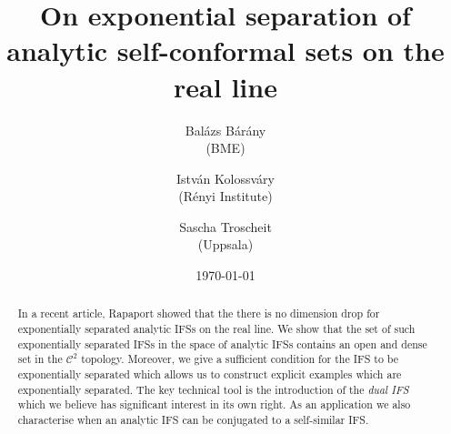 \documentclass[11pt,]{article}
\title{On exponential separation of analytic self-conformal sets on the real line}
\author{Bal\'azs B\'ar\'any\\(BME) \and Istv\'an
  Kolossv\'ary\\ (R\'enyi Institute) \and Sascha
Troscheit \\(Uppsala)}
\date{\today}
\theoremstyle{definition}
\theoremstyle{remark}
\newcommand{\0}{\mathbf{0}}
\numberwithin{equation}{section}
\begin{document}
\frenchspacing
\maketitle


\begin{abstract}
In a recent article, Rapaport showed that the there is no dimension drop for
exponentially separated analytic IFSs on the real line. We show that the set of such exponentially
separated IFSs in the space of analytic IFSs contains an open and dense set in the $\mathcal{C}^2$
topology. Moreover, we give a sufficient condition for the IFS to be exponentially separated which
allows us to construct explicit examples which are exponentially separated. The key
technical tool is the introduction of the \emph{dual IFS} which we believe has significant interest
in its own right. As an application we also characterise when an analytic IFS can be conjugated to a
self-similar IFS. 
\end{abstract}


%
%

\end{document}
